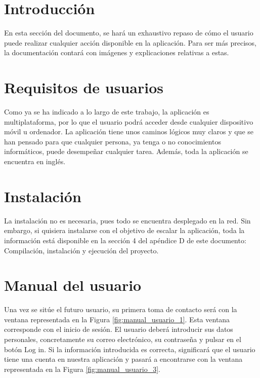 
\section{Introducción}

	En esta sección del documento, se hará un exhaustivo repaso de cómo el usuario puede realizar cualquier acción disponible en la aplicación. Para ser más precisos, la documentación contará con imágenes y explicaciones relativas a estas.

\section{Requisitos de usuarios}

	Como ya se ha indicado a lo largo de este trabajo, la aplicación es multiplataforma, por lo que el usuario podrá acceder desde cualquier dispositivo móvil u ordenador. La aplicación tiene unos caminos lógicos muy claros y que se han pensado para que cualquier persona, ya tenga o no conocimientos informáticos, puede desempeñar cualquier tarea. Además, toda la aplicación se encuentra en inglés.

\section{Instalación}

	La instalación no es necesaria, pues todo se encuentra desplegado en la red. Sin embargo, si quisiera instalarse con el objetivo de escalar la aplicación, toda la información está disponible en la sección 4 del apéndice D de este documento: Compilación, instalación y ejecución del proyecto.

\section{Manual del usuario}

	Una vez se sitúe el futuro usuario, su primera toma de contacto será con la ventana representada en la Figura \ref{fig:manual_usuario_1}. Esta ventana corresponde con el inicio de sesión. El usuario deberá introducir sus datos personales, concretamente su correo electrónico, su contraseña y pulsar en el botón Log in. Si la información introducida es correcta, significará que el usuario tiene una cuenta en nuestra aplicación y pasará a encontrarse con la ventana representada en la Figura \ref{fig:manual_usuario_3}.
	
